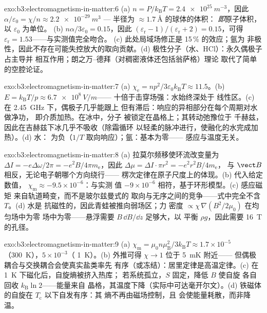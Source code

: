 \begin{solution}{exo:b3:electromagnetism-in-matter:6}
(a) $n = P/k_{\text{B}}T = \qty{2.4e25}{m^{-3}}$，因此
$\alpha/\varepsilon_0 = \chi/n \approx \qty{2.2e-29}{m^3}$ ---
半径为 $\approx\qty{1.7}{\angstrom}$ 的球体的体积：
\emph{即}原子体积，以 $\varepsilon_0$ 为单位。
(b) $n\alpha/3\varepsilon_0 = 0.15$，因此 $(\varepsilon_{\text{r}} -
1)/(\varepsilon_{\text{r}} + 2) = 0.15$，可得
$\varepsilon_{\text{r}} = 1.53$——与实测值完全吻合。
(c) 此处局域场修正是 15\,\% 的效应；氩为
非极性，因此不存在可能失控放大的取向贡献。(d)
极性分子（水、HCl）：永久偶极子占主导并
相互作用；朗之万–德拜（对稠密液体还包括翁萨格）理论
取代了简单的空腔论证。
\end{solution}

\begin{solution}{exo:b3:electromagnetism-in-matter:7}
(a) $\chi_{\text{e}} = np^2/3\varepsilon_0k_{\text{B}}T \approx
11.5$。(b) $E = k_{\text{B}}T/p \approx \qty{6.7e8}{V/m}$——
十倍于击穿场强：水始终深处于
线性区。(c) 在 \qty{2.45}{GHz} 下，偶极子几乎能跟上
但有滞后：响应的异相部分在每个周期对水做净功，
即介质加热。在冰中，分子
被锁定在晶格上；其转动弛豫位于
千赫兹，因此在吉赫兹下冰几乎不吸收（除霜循环
以轻柔的脉冲进行，使融化的水完成加热）。(d) 水：
为负（$1/T$ 取向响应）；氩：基本为零——
感应与温度无关。
\end{solution}

\begin{solution}{exo:b3:electromagnetism-in-matter:8}
(a) 拉莫尔频移使环流改变量为 $\Delta I
= -e\Delta\omega/2\pi = -e^2B/4\pi m_{\text{e}}$，因此
$\Delta\mu = \Delta I\cdot\pi r^2 = -e^2r^2B/4m_{\text{e}}$，
与 $\vect B$ 相反，无论电子朝哪个方向绕行——
楞次定律在原子尺度上的体现。(b) 代入给定数值，
$\chi_{\text{m}} \approx -9.5\times10^{-6}$：与实测
值 $-9\times10^{-6}$ 相符，基于环形模型。(c) 感应磁矩
来自轨道畸变，而不是玻尔兹曼式的
取向与无序之间的竞争——式中完全不含 $T$。(d) 水是
抗磁性的，因此青蛙被推向弱场区；力
密度 $\propto \chi\,\nabla(B^2/2\mu_0)$ 在均匀场中为零
场中为零——悬浮需要 $B\,\dd B/\dd z$ 足够大，以
平衡 $\rho g$，因此需要 \qty{16}{T} 的孔径。
\end{solution}

\begin{solution}{exo:b3:electromagnetism-in-matter:9}
(a) $\chi_{\text{m}} = \mu_0n\mu_{\text{B}}^2/3k_{\text{B}}T
\approx 1.7\times10^{-5}$（\qty{300}{K}），$5\times10^{-3}$（
\qty{1}{K}）。(b) 外推可得 $\chi \to 1$ 位于 \qty{5}{mK} 附近——
但偶极耦合与交换耦合会使真实盐类率先
有序（或冻结）：居里定律是高温定律。(c) 在
\qty{1}{K} 下磁化后，自旋熵被挤入热库；
若系统孤立，$S$ 固定，降低 $B$ 使自旋
各自回收 $k_{\text{B}}\ln 2$——能量来自
晶格，其温度下降（实际中可达毫开尔文）。(d)
铁磁体的自旋在 $T_{\text{c}}$ 以下自发有序：其
熵不再由磁场控制，且
会使能量耗散，而非降温。
\end{solution}

